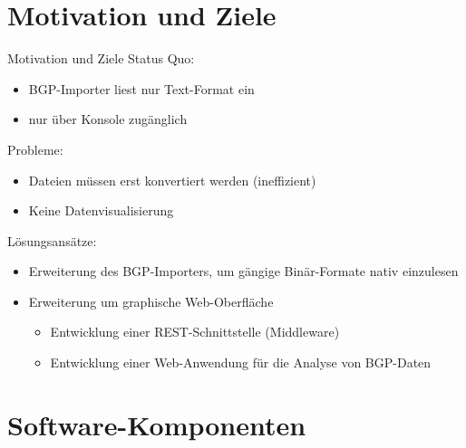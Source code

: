 \documentclass[9pt]{beamer}
\begin{document}
\section{Motivation und Ziele}

\begin{frame}{Motivation und Ziele}{}
   Status Quo:
	\begin{itemize}
		\item BGP-Importer liest nur Text-Format ein
		\item nur über Konsole zugänglich
		\end{itemize}
		\vspace{0,2cm}		
	Probleme:
		\begin{itemize}
		\item Dateien müssen erst konvertiert werden (ineffizient)
		\item Keine Datenvisualisierung
		\end{itemize}
		\vspace{0,2cm}
	Lösungsansätze:
		\begin{itemize}
			\item Erweiterung des BGP-Importers, um gängige Binär-Formate nativ 
			         einzulesen
			\item Erweiterung um graphische Web-Oberfläche
			\vspace{0,1cm}
		\begin{itemize}
			\item Entwicklung einer REST-Schnittstelle (Middleware)
			\item Entwicklung einer Web-Anwendung für die Analyse von BGP-Daten
		\end{itemize}
		\end{itemize}
\end{frame}

\section{Software-Komponenten}
\end{document}
